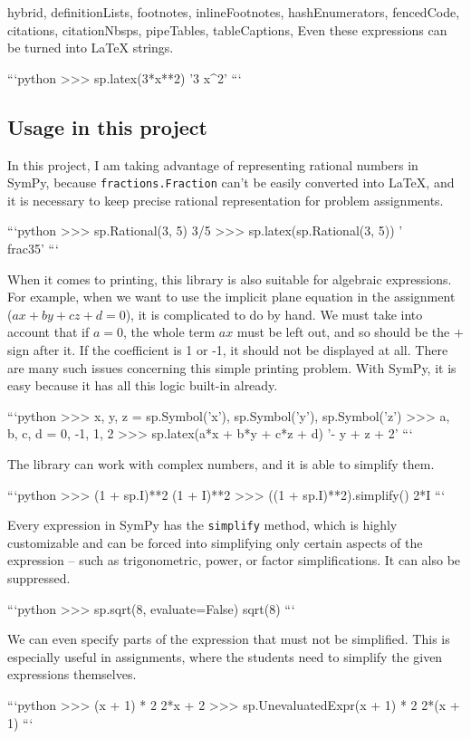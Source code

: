 \begin{markdown*}{%
  hybrid,
  definitionLists,
  footnotes,
  inlineFootnotes,
  hashEnumerators,
  fencedCode,
  citations,
  citationNbsps,
  pipeTables,
  tableCaptions,
}
Even these expressions can be turned into \LaTeX{} strings.

```python
>>> sp.latex(3*x**2)
'3 x^{2}'
```

\subsection{Usage in this project}

In this project, I am taking advantage of representing rational numbers in SymPy, because \verb|fractions.Fraction| can't be easily converted into \LaTeX{}, and it is necessary to keep precise rational representation for problem assignments. 

```python
>>> sp.Rational(3, 5)
3/5
>>> sp.latex(sp.Rational(3, 5))
'\\frac{3}{5}'
```

When it comes to printing, this library is also suitable for algebraic expressions. For example, when we want to use the implicit plane equation in the assignment ($ax + by +cz +d = 0$), it is complicated to do by hand. We must take into account that if $a = 0$, the whole term $ax$ must be left out, and so should be the $+$ sign after it. If the coefficient is 1 or -1, it should not be displayed at all. There are many such issues concerning this simple printing problem. With SymPy, it is easy because it has all this logic built-in already.

```python
>>> x, y, z = sp.Symbol('x'), sp.Symbol('y'), sp.Symbol('z')
>>> a, b, c, d = 0, -1, 1, 2
>>> sp.latex(a*x + b*y + c*z + d)
'- y + z + 2'
```

The library can work with complex numbers, and it is able to simplify them. 

```python
>>> (1 + sp.I)**2 
(1 + I)**2
>>> ((1 + sp.I)**2).simplify()
2*I
```

Every expression in SymPy has the \verb|simplify| method, which is highly customizable and can be forced into simplifying only certain aspects of the expression -- such as trigonometric, power, or  factor simplifications. It can also be suppressed.

```python
>>> sp.sqrt(8, evaluate=False)
sqrt(8)
```

We can even specify parts of the expression that must not be simplified. This is especially useful in assignments, where the students need to simplify the given expressions themselves.

```python
>>> (x + 1) * 2
2*x + 2
>>> sp.UnevaluatedExpr(x + 1) * 2
2*(x + 1)
```


\end{markdown*}
